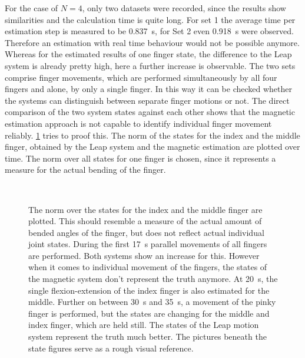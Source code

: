 For the case of $ N = 4 $, only two datasets were recorded, since the results show similarities and the calculation time is quite long. For set 1 the average time per estimation step is measured to be \SI{0.837}{\second}, for Set 2 even \SI{0.918}{\second} were observed. Therefore an estimation with real time behaviour would not be possible anymore. Whereas for the estimated results of one finger state, the difference to the Leap system is already pretty high, here a further increase is observable. The two sets comprise finger movements, which are performed simultaneously by all four fingers and alone, by only a single finger. In this way it can be checked whether the systems can distinguish between separate finger motions or not. The direct comparison of the two system states against each other shows that the magnetic estimation approach is not capable to identify individual finger movement reliably. \ref{fig:est44} tries to proof this. The norm of the states for the index and the middle finger, obtained by the Leap system and the magnetic estimation are plotted over time. The norm over all states for one finger is chosen, since it represents a measure for the actual bending of the finger. 
\begin{figure}[!htb]
\centering
{}\\
\caption[Estimating the motion of four fingers]
{The norm over the states for the index and the middle finger are plotted. This should resemble a measure of the actual amount of bended angles of the finger, but does not reflect actual individual joint states. During the first \SI{17}{\second} parallel movements of all fingers are performed. Both systems show an increase for this. However when it comes to individual movement of the fingers, the states of the magnetic system don't represent the truth anymore. At \SI{20}{\second}, the single flexion-extension of the index finger is also estimated for the middle. Further on between \SI{30}{\second} and \SI{35}{\second}, a movement of the pinky finger is performed, but the states are changing for the middle and index finger, which are held still. The states of the Leap motion system represent the truth much better. The pictures beneath the state figures serve as a rough visual reference.}
\label{fig:est44}
\end{figure}

